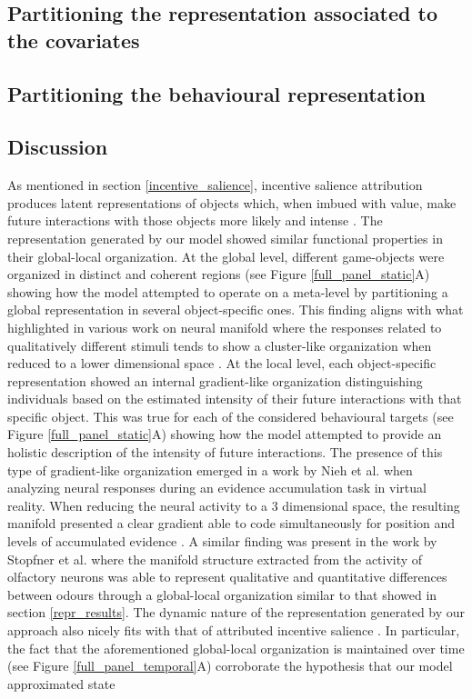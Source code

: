 \subsection{Partitioning the representation associated to the covariates}
\lorem

\subsection{Partitioning the behavioural representation}
\lorem

\subsection{Discussion}
As mentioned in section  \ref{incentive_salience}, incentive salience attribution produces latent representations of objects which, when imbued with value, make future interactions with those objects more likely and intense \cite{berridge1998role,berridge2004motivation}. The representation generated by our model showed similar functional properties in their global-local organization. At the global level, different game-objects were organized in distinct and coherent regions (see Figure \ref{full_panel_static}A) showing how the model attempted to operate on a meta-level by partitioning a global representation in several object-specific ones. This finding aligns with what highlighted in various work on neural manifold where the responses related to qualitatively different stimuli tends to show a cluster-like organization when reduced to a lower dimensional space \cite{stopfer2003intensity, gallego2017neural, ganmor2015thesaurus}. At the local level, each object-specific representation showed an internal gradient-like organization distinguishing individuals based on the estimated intensity of their future interactions with that specific object. This was true for each of the considered behavioural targets (see Figure \ref{full_panel_static}A) showing how the model attempted to provide an holistic description of the intensity of future interactions. The presence of this type of gradient-like organization emerged in a work by Nieh et al. \cite{nieh2021geometry} when analyzing neural responses during an evidence accumulation task in virtual reality. When reducing the neural activity to a 3 dimensional space, the resulting manifold presented a clear gradient able to code simultaneously for position and levels of accumulated evidence \cite{nieh2021geometry}. A similar finding was present in the work by Stopfner et al. \cite{stopfer2003intensity} where the manifold structure extracted from the activity of olfactory neurons was able to represent qualitative and quantitative differences between odours through a global-local organization similar to that showed in section \ref{repr_results}. The dynamic nature of the representation generated by our approach also nicely fits with that of attributed incentive salience \cite{toates1994comparing,robinson1993neural,zhang2009neural,tindell2009dynamic,berridge2012prediction}. In particular, the fact that the aforementioned global-local organization is maintained over time (see Figure \ref{full_panel_temporal}A) corroborate the hypothesis that our model approximated state 